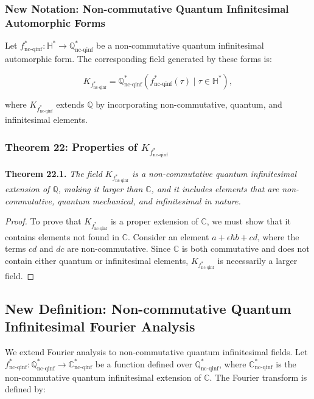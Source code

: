 \documentclass{article}
\begin{document}
\subsubsection{New Notation: Non-commutative Quantum Infinitesimal Automorphic Forms}
Let \(f_{\text{nc-qinf}}^*: \mathbb{H}^* \to \mathbb{Q}_{\text{nc-qinf}}^*\) be a non-commutative quantum infinitesimal automorphic form. The corresponding field generated by these forms is:

\[
K_{f_{\text{nc-qinf}}^*} = \mathbb{Q}_{\text{nc-qinf}}^*(f_{\text{nc-qinf}}^*(\tau) \mid \tau \in \mathbb{H}^*),
\]

where \(K_{f_{\text{nc-qinf}}^*}\) extends \(\mathbb{Q}\) by incorporating non-commutative, quantum, and infinitesimal elements.

\subsubsection{Theorem 22: Properties of \(K_{f_{\text{nc-qinf}}^*}\)}
\textbf{Theorem 22.1.} \textit{The field \(K_{f_{\text{nc-qinf}}^*}\) is a non-commutative quantum infinitesimal extension of \(\mathbb{Q}\), making it larger than \(\mathbb{C}\), and it includes elements that are non-commutative, quantum mechanical, and infinitesimal in nature.}

\begin{proof}
To prove that \(K_{f_{\text{nc-qinf}}^*}\) is a proper extension of \(\mathbb{C}\), we must show that it contains elements not found in \(\mathbb{C}\). Consider an element \(a + \epsilon \hbar b + c d\), where the terms \(c d\) and \(d c\) are non-commutative. Since \(\mathbb{C}\) is both commutative and does not contain either quantum or infinitesimal elements, \(K_{f_{\text{nc-qinf}}^*}\) is necessarily a larger field.
\end{proof}

\subsection{New Definition: Non-commutative Quantum Infinitesimal Fourier Analysis}
We extend Fourier analysis to non-commutative quantum infinitesimal fields. Let \(f_{\text{nc-qinf}}^*: \mathbb{Q}_{\text{nc-qinf}}^* \to \mathbb{C}_{\text{nc-qinf}}^*\) be a function defined over \(\mathbb{Q}_{\text{nc-qinf}}^*\), where \(\mathbb{C}_{\text{nc-qinf}}^*\) is the non-commutative quantum infinitesimal extension of \(\mathbb{C}\). The Fourier transform is defined by:
\end{document}
